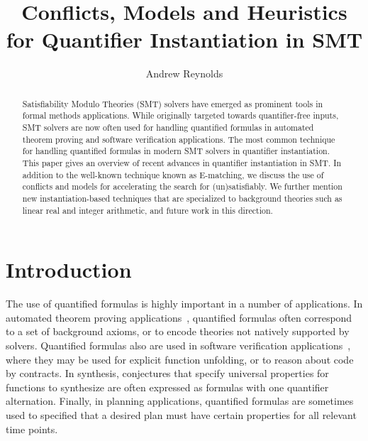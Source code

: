 \documentclass{easychair}
\begin{document}
\title{Conflicts, Models and Heuristics for Quantifier Instantiation in SMT}

\author {Andrew Reynolds}

\maketitle

\pagestyle{plain}

\begin{abstract}
Satisfiability Modulo Theories (SMT) solvers have
emerged as prominent tools in formal methods applications.
While originally targeted towards quantifier-free inputs,
SMT solvers are now often used for handling quantified formulas in automated
theorem proving and software verification applications.
The most common technique for handling quantified formulas in modern SMT solvers
in quantifier instantiation.
This paper gives an overview of recent advances in quantifier instantiation in SMT.
In addition to the well-known technique known as E-matching,
we discuss the use of conflicts and models for 
accelerating the search for (un)satisfiably.
We further mention new instantiation-based techniques
that are specialized to background theories such as linear real and integer arithmetic,
and future work in this direction.
\end{abstract}

\section{Introduction}

The use of quantified formulas is highly important in a number of applications.
In automated theorem proving applications~\cite{blanchette2013extending,bobot2011why3},
quantified formulas often correspond to a set of background axioms,
or to encode theories not natively supported by solvers.
Quantified formulas also are used in software verification applications~\cite{DBLP:conf/icse/Leino04,DBLP:conf/itp/ChapmanS14},
where they may be used for explicit function unfolding, or to reason about code by contracts.
In synthesis, conjectures that specify universal properties for functions to synthesize are often expressed as formulas
with one quantifier alternation.
Finally, in planning applications, quantified formulas are sometimes used to specified
that a desired plan must have certain properties for all relevant time points.
\end{document}
